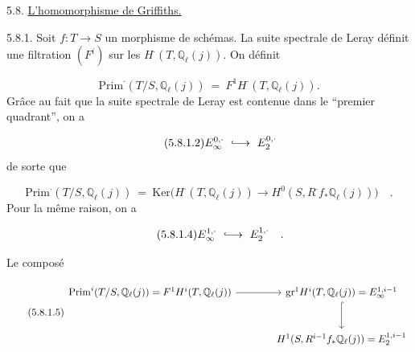 5.8. \underline{L'homomorphisme de Griffiths.}

5.8.1. Soit $f: T \longrightarrow S$ un morphisme de schémas. La suite spectrale de Leray définit une filtration $(F^i)$ sur les $H^{\cdot}(T,\mathbb{Q}_\ell(j))$. On définit

\begin{equation}\tag{5.8.1.1}
\mathrm{Prim}^{\cdot}(T/S,\mathbb{Q}_\ell(j)) \ = \ F^1H^{\cdot}(T,\mathbb{Q}_\ell(j)).
\end{equation}
Grâce au fait que la suite spectrale de Leray est contenue dans le ``premier quadrant'', on a

\begin{equation}\tag{5.8.1.2}
E_\infty^{0,\cdot} \ \lhook\joinrel\longrightarrow \ E_2^{0,\cdot}
\end{equation}
de sorte que

\begin{equation}\tag{5.8.1.3}
\mathrm{Prim}^{\cdot}(T/S,\mathbb{Q}_\ell(j)) \ = \ \mathrm{Ker} \bigl(H^{\cdot}(T,\mathbb{Q}_\ell(j)) \longrightarrow H^0(S,R^{\cdot}f_*\mathbb{Q}_\ell(j))\bigr) \quad .
\end{equation}
Pour la même raison, on a

\begin{equation}\tag{5.8.1.4}
E_\infty^{1,\cdot} \ \lhook\joinrel\longrightarrow \ E_2^{1,\cdot} \quad .
\end{equation}


%
Le composé

\begin{equation}\tag{5.8.1.5}
\begin{tikzcd}[column sep=large, row sep=large]
\mathrm{Prim}^i(T/S,\mathbb{Q}_\ell(j)) = F^1H^i(T,\mathbb{Q}_\ell(j)) \arrow[r] & \mathrm{gr}^1H^i(T,\mathbb{Q}_\ell(j)) = E_\infty^{1,i-1} \arrow[d, hook] \\
{} & H^1(S,R^{i-1}f_*\mathbb{Q}_\ell(j)) = E_2^{1,i-1}
\end{tikzcd}
\end{equation}

